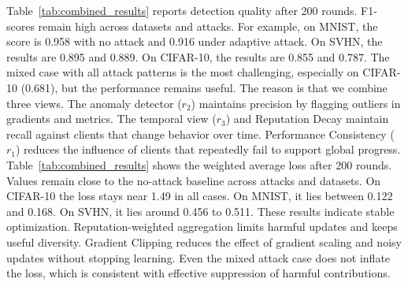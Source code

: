 \documentclass[lettersize,journal]{IEEEtran}
\begin{document}
{Table~\ref{tab:combined_results} reports detection quality after 200 rounds. F1-scores remain high across datasets and attacks. For example, on MNIST, the score is 0.958 with no attack and 0.916 under adaptive attack. On SVHN, the results are 0.895 and 0.889. On CIFAR-10, the results are 0.855 and 0.787. The mixed case with all attack patterns is the most challenging, especially on CIFAR-10 (0.681), but the performance remains useful. The reason is that we combine three views. The anomaly detector ($r_2$) maintains precision by flagging outliers in gradients and metrics. The temporal view ($r_3$) and Reputation Decay maintain recall against clients that change behavior over time. Performance Consistency ($r_1$) reduces the influence of clients that repeatedly fail to support global progress.
Table~\ref{tab:combined_results} shows the weighted average loss after 200 rounds. Values remain close to the no-attack baseline across attacks and datasets. On CIFAR-10 the loss stays near 1.49 in all cases. On MNIST, it lies between 0.122 and 0.168. On SVHN, it lies around 0.456 to 0.511. These results indicate stable optimization. Reputation-weighted aggregation limits harmful updates and keeps useful diversity. Gradient Clipping reduces the effect of gradient scaling and noisy updates without stopping learning. Even the mixed attack case does not inflate the loss, which is consistent with effective suppression of harmful contributions.





}
\end{document}
